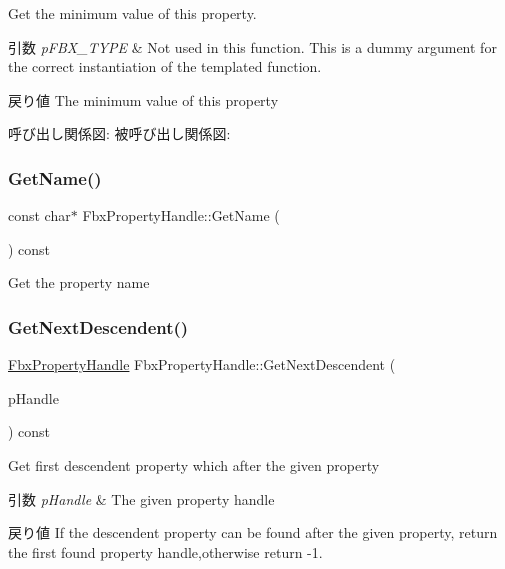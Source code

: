 Get the minimum value of this property. 
\begin{DoxyParams}{引数}
{\em p\+F\+B\+X\+\_\+\+T\+Y\+PE} & Not used in this function. This is a dummy argument for the correct instantiation of the templated function. \\
\hline
\end{DoxyParams}
\begin{DoxyReturn}{戻り値}
The minimum value of this property 
\end{DoxyReturn}
呼び出し関係図\+:
被呼び出し関係図\+:
\mbox{\label{class_fbx_property_handle_a38a846122c8564c62fb58426235b12e6}} 
\subsubsection{\texorpdfstring{Get\+Name()}{GetName()}}
{\footnotesize\ttfamily const char$\ast$ Fbx\+Property\+Handle\+::\+Get\+Name (\begin{DoxyParamCaption}{ }\end{DoxyParamCaption}) const}



Get the property name 

\mbox{\label{class_fbx_property_handle_a9285a1cf6dbf3854335a0a05eaf1d95f}} 
\subsubsection{\texorpdfstring{Get\+Next\+Descendent()}{GetNextDescendent()}}
{\footnotesize\ttfamily \hyperlink{class_fbx_property_handle}{Fbx\+Property\+Handle} Fbx\+Property\+Handle\+::\+Get\+Next\+Descendent (\begin{DoxyParamCaption}\item[{const \hyperlink{class_fbx_property_handle}{Fbx\+Property\+Handle} \&}]{p\+Handle }\end{DoxyParamCaption}) const}

Get first descendent property which after the given property 
\begin{DoxyParams}{引数}
{\em p\+Handle} & The given property handle \\
\hline
\end{DoxyParams}
\begin{DoxyReturn}{戻り値}
If the descendent property can be found after the given property, return the first found property handle,otherwise return -\/1. 
\end{DoxyReturn}
\mbox{\label{class_fbx_property_handle_a477ba4c610b36333701547d8aff9fa48}} 
